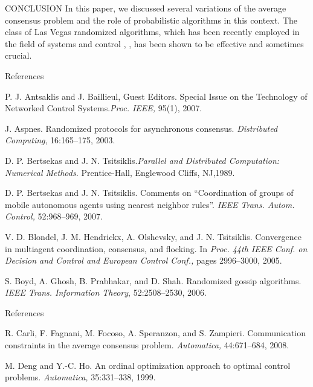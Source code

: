 \documentclass[xcolor={dvipsnames}]{beamer}
\begin{document}
	\begin{frame}{CONCLUSION}
		In this paper, we discussed several variations of the
		average consensus problem and the role of probabilistic
		algorithms in this context. The class of Las Vegas randomized
		algorithms, which has been recently employed in the
		field of systems and control \cite{bib11}, \cite{bib24}, has been shown
		to be effective and sometimes crucial.
	\end{frame}
    \begin{thebibliography}{30}
	\begin{frame}{References}

         P. J. Antsaklis and J. Baillieul, Guest Editors. Special Issue on the Technology of Networked Control Systems.\textit{Proc. IEEE,} 95(1), 2007.
		
		
		 J. Aspnes. Randomized protocols for asynchronous consensus. \textit{Distributed Computing}, 16:165–175, 2003.
		
		
		 D. P. Bertsekas and J. N. Tsitsiklis.\textit{Parallel and Distributed Computation: Numerical Methods.} Prentice-Hall, Englewood Cliffs, NJ,1989.
		
		
		 D. P. Bertsekas and J. N. Tsitsiklis. Comments on “Coordination of groups of mobile autonomous agents using nearest neighbor rules”. \textit{IEEE Trans. Autom. Control,} 52:968–969, 2007.
		
		
		 V. D. Blondel, J. M. Hendrickx, A. Olshevsky, and J. N. Tsitsiklis. Convergence in multiagent coordination, consensus, and flocking. In \textit{Proc. 44th IEEE Conf. on Decision and Control and European Control Conf.,} pages 2996–3000, 2005.
		
		
		 S. Boyd, A. Ghosh, B. Prabhakar, and D. Shah. Randomized gossip algorithms. \textit{IEEE Trans. Information Theory}, 52:2508–2530, 2006.

	\end{frame}

	\begin{frame}{References}

		 R. Carli, F. Fagnani, M. Focoso, A. Speranzon, and S. Zampieri. Communication constraints in the average consensus problem. \textit{Automatica,} 44:671–684, 2008.
		
		
		 M. Deng and Y.-C. Ho. An ordinal optimization approach to optimal control problems. \textit{ Automatica,} 35:331–338, 1999.
		

\end{frame}
\end{thebibliography}
\end{document}
